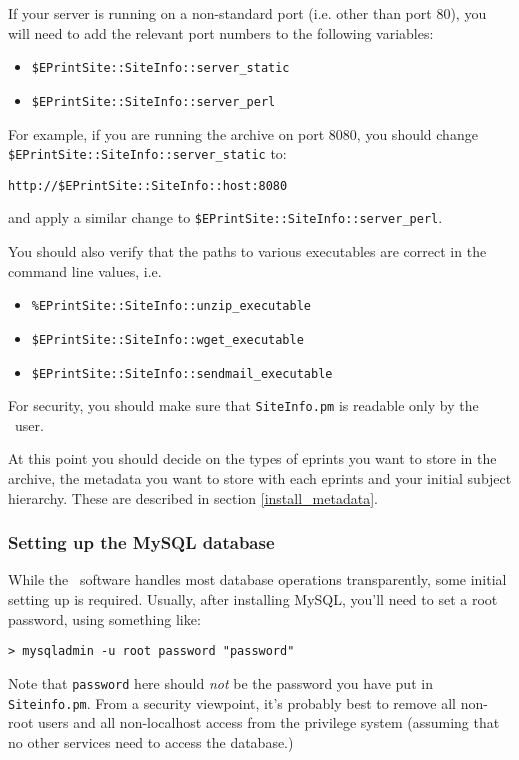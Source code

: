 If your server is running on a non-standard port (i.e. other than port 80), you will need to add the relevant port numbers to the following variables:

\begin{itemize}
\item {\tt \$EPrintSite::SiteInfo::server\_static}
\item {\tt \$EPrintSite::SiteInfo::server\_perl}
\end{itemize}

For example, if you are running the archive on port 8080, you should change {\tt \$EPrintSite::SiteInfo::server\_static} to:

{\tt http://\$EPrintSite::SiteInfo::host:8080}

and apply a similar change to {\tt \$EPrintSite::SiteInfo::server\_perl}.

You should also verify that the paths to various executables are correct in the command line values, i.e.

\begin{itemize}
\item {\tt \%EPrintSite::SiteInfo::unzip\_executable}
\item {\tt \$EPrintSite::SiteInfo::wget\_executable}
\item {\tt \$EPrintSite::SiteInfo::sendmail\_executable}
\end{itemize}

For security, you should make sure that {\tt SiteInfo.pm} is readable only by the \eprints\ user.

At this point you should decide on the types of eprints you want to store in the archive, the metadata you want to store with each eprints and your initial subject hierarchy. These are described in section \ref{install_metadata}.


\subsubsection{Setting up the MySQL database}
\label{manual_create_db}

While the \eprints\ software handles most database operations transparently, some initial setting up is required. Usually, after installing MySQL, you'll need to set a root password, using something like:

\begin{verbatim}
> mysqladmin -u root password "password"
\end{verbatim}

Note that {\tt password} here should \emph{not} be the password you have put in {\tt Siteinfo.pm}. From a security viewpoint, it's probably best to remove all non-root users and all non-localhost access from the privilege system (assuming that no other services need to access the database.)


